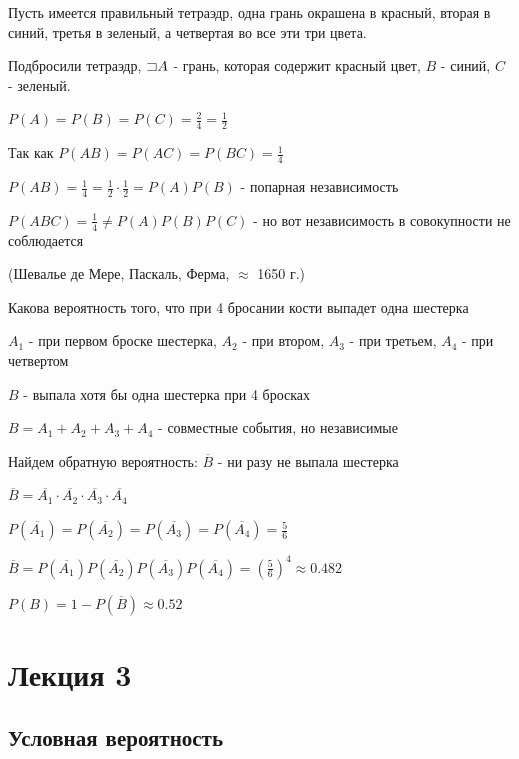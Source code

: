 \documentclass[12pt]{article}
\begin{document}
    Пусть имеется правильный тетраэдр, одна грань окрашена в красный, вторая в синий, третья в зеленый, а четвертая во все эти три цвета.

    Подбросили тетраэдр, $\mathord{\sqsupset} A$ - грань, которая содержит красный цвет, $B$ - синий, $C$ - зеленый.

    $P(A) = P(B) = P(C) = \frac{2}{4} = \frac{1}{2}$

    Так как $P(AB) = P(AC) = P(BC) = \frac{1}{4}$

    $P(AB) = \frac{1}{4} = \frac{1}{2} \cdot \frac{1}{2} = P(A) P(B)$ - попарная независимость

    $P(ABC) = \frac{1}{4} \neq P(A) P(B) P(C)$ - но вот независимость в совокупности не соблюдается

    \Ex (Шевалье де Мере, Паскаль, Ферма, $\approx$ 1650 г.)

    Какова вероятность того, что при 4 бросании кости выпадет одна шестерка

    $A_1$ - при первом броске шестерка, $A_2$ - при втором, $A_3$ - при третьем, $A_4$ - при четвертом

    $B$ - выпала хотя бы одна шестерка при 4 бросках

    $B = A_1 + A_2 + A_3 + A_4$ - совместные события, но независимые

    Найдем обратную вероятность: $\overline{B}$ - ни разу не выпала шестерка

    $\overline{B} = \overline{A_1} \cdot \overline{A_2} \cdot \overline{A_3} \cdot \overline{A_4}$

    $P(\overline{A_1}) = P(\overline{A_2}) = P(\overline{A_3}) = P(\overline{A_4}) = \frac{5}{6}$

    $\overline{B} = P(\overline{A_1}) P(\overline{A_2}) P(\overline{A_3}) P(\overline{A_4}) = \left(\frac{5}{6}\right)^4 \approx 0.482$

    $P(B) = 1 - P(\overline{B}) \approx 0.52$


    \section{Лекция 3}

    \hypertarget{conditionalprobability}{}

    \subsection{Условная вероятность}
\end{document}
